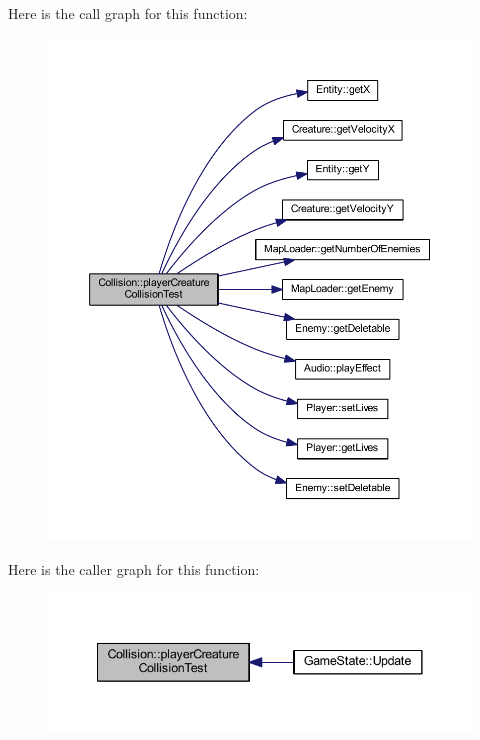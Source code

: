 Here is the call graph for this function\+:
\nopagebreak
\begin{figure}[H]
\begin{center}
\leavevmode
\includegraphics[width=350pt]{class_collision_ac758fa708f12d9121bb2aacc787111e4_cgraph}
\end{center}
\end{figure}




Here is the caller graph for this function\+:
\nopagebreak
\begin{figure}[H]
\begin{center}
\leavevmode
\includegraphics[width=341pt]{class_collision_ac758fa708f12d9121bb2aacc787111e4_icgraph}
\end{center}
\end{figure}


